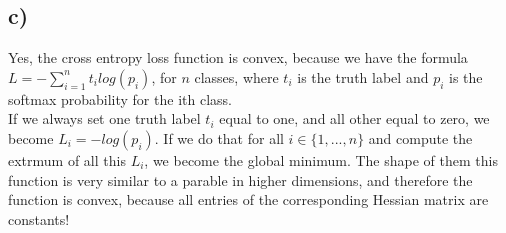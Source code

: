 \documentclass[a4paper]{article}
\begin{document}
        
    \subsection*{c)}
        Yes, the cross entropy loss function is convex, because we have the formula $L = - \sum\limits_{i=1}^n t_i log(p_i)$, for $n$ classes, where $t_i$ is the truth label and $p_i$ is the softmax probability for the ith class.\\
        If we always set one truth label $t_i$ equal to one, and all other equal to zero, we become $L_i = -log(p_i)$.
        If we do that for all $i \in \{1,...,n\}$ and compute the extrmum of all this $L_i$, we become the global minimum.
        The shape of them this function is very similar to a parable in higher dimensions, and therefore the function is convex, because all entries of the corresponding Hessian matrix are constants!
    
    
\end{document}
